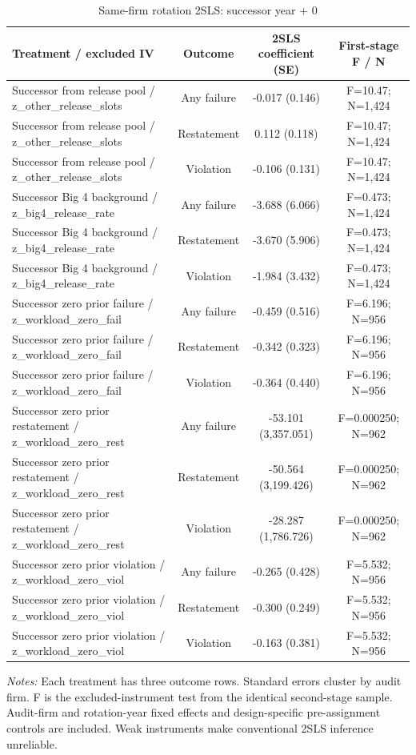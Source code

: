 \begin{table}[htbp]
\footnotesize
\centering
\caption{Same-firm rotation 2SLS: successor year + 0}
\begin{threeparttable}
\begin{tabular}{p{}ccc}
\toprule
Treatment / excluded IV & Outcome & 2SLS coefficient (SE) & First-stage F / N \\
\midrule
Successor from release pool / z\_other\_release\_slots & Any failure & -0.017 (0.146) & F=10.47; N=1,424 \\
Successor from release pool / z\_other\_release\_slots & Restatement & 0.112 (0.118) & F=10.47; N=1,424 \\
Successor from release pool / z\_other\_release\_slots & Violation & -0.106 (0.131) & F=10.47; N=1,424 \\
Successor Big 4 background / z\_big4\_release\_rate & Any failure & -3.688 (6.066) & F=0.473; N=1,424 \\
Successor Big 4 background / z\_big4\_release\_rate & Restatement & -3.670 (5.906) & F=0.473; N=1,424 \\
Successor Big 4 background / z\_big4\_release\_rate & Violation & -1.984 (3.432) & F=0.473; N=1,424 \\
Successor zero prior failure / z\_workload\_zero\_fail & Any failure & -0.459 (0.516) & F=6.196; N=956 \\
Successor zero prior failure / z\_workload\_zero\_fail & Restatement & -0.342 (0.323) & F=6.196; N=956 \\
Successor zero prior failure / z\_workload\_zero\_fail & Violation & -0.364 (0.440) & F=6.196; N=956 \\
Successor zero prior restatement / z\_workload\_zero\_rest & Any failure & -53.101 (3,357.051) & F=0.000250; N=962 \\
Successor zero prior restatement / z\_workload\_zero\_rest & Restatement & -50.564 (3,199.426) & F=0.000250; N=962 \\
Successor zero prior restatement / z\_workload\_zero\_rest & Violation & -28.287 (1,786.726) & F=0.000250; N=962 \\
Successor zero prior violation / z\_workload\_zero\_viol & Any failure & -0.265 (0.428) & F=5.532; N=956 \\
Successor zero prior violation / z\_workload\_zero\_viol & Restatement & -0.300 (0.249) & F=5.532; N=956 \\
Successor zero prior violation / z\_workload\_zero\_viol & Violation & -0.163 (0.381) & F=5.532; N=956 \\
\bottomrule
\end{tabular}
\begin{tablenotes}\footnotesize
\item \raggedright \textit{Notes:} Each treatment has three outcome rows. Standard errors cluster by audit firm. F is the excluded-instrument test from the identical second-stage sample. Audit-firm and rotation-year fixed effects and design-specific pre-assignment controls are included. Weak instruments make conventional 2SLS inference unreliable.
\end{tablenotes}
\end{threeparttable}
\end{table}
